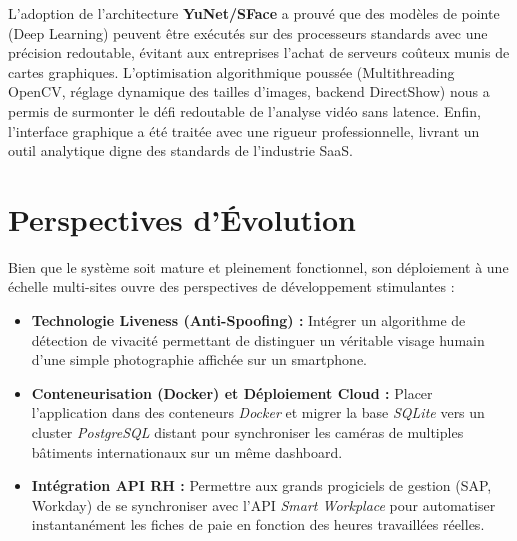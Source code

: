 \documentclass[12pt,a4paper]{report}
\begin{document}
L'adoption de l'architecture \textbf{YuNet/SFace} a prouvé que des modèles de pointe (Deep Learning) peuvent être exécutés sur des processeurs standards avec une précision redoutable, évitant aux entreprises l'achat de serveurs coûteux munis de cartes graphiques. L'optimisation algorithmique poussée (Multithreading OpenCV, réglage dynamique des tailles d'images, backend DirectShow) nous a permis de surmonter le défi redoutable de l'analyse vidéo sans latence. Enfin, l'interface graphique a été traitée avec une rigueur professionnelle, livrant un outil analytique digne des standards de l'industrie SaaS.

\section*{Perspectives d'Évolution}
Bien que le système soit mature et pleinement fonctionnel, son déploiement à une échelle multi-sites ouvre des perspectives de développement stimulantes :
\begin{itemize}
    \item \textbf{Technologie Liveness (Anti-Spoofing) :} Intégrer un algorithme de détection de vivacité permettant de distinguer un véritable visage humain d'une simple photographie affichée sur un smartphone.
    \item \textbf{Conteneurisation (Docker) et Déploiement Cloud :} Placer l'application dans des conteneurs \textit{Docker} et migrer la base \textit{SQLite} vers un cluster \textit{PostgreSQL} distant pour synchroniser les caméras de multiples bâtiments internationaux sur un même dashboard.
    \item \textbf{Intégration API RH :} Permettre aux grands progiciels de gestion (SAP, Workday) de se synchroniser avec l'API \textit{Smart Workplace} pour automatiser instantanément les fiches de paie en fonction des heures travaillées réelles.
\end{itemize}
\end{document}

